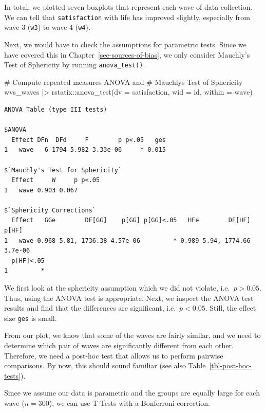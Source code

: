 \documentclass[
  letterpaper,
  DIV=11,
  numbers=noendperiod]{scrreprt}
\newenvironment{Shaded}{\begin{snugshade}}{\end{snugshade}}
\newcommand{\AttributeTok}[1]{\textcolor[rgb]{0.40,0.45,0.13}{#1}}
\newcommand{\CommentTok}[1]{\textcolor[rgb]{0.37,0.37,0.37}{#1}}
\newcommand{\FunctionTok}[1]{\textcolor[rgb]{0.28,0.35,0.67}{#1}}
\newcommand{\NormalTok}[1]{\textcolor[rgb]{0.00,0.23,0.31}{#1}}
\newcommand{\SpecialCharTok}[1]{\textcolor[rgb]{0.37,0.37,0.37}{#1}}
\begin{document}
In total, we plotted seven boxplots that represent each wave of data
collection. We can tell that \texttt{satisfaction} with life has
improved slightly, especially from wave 3 (\texttt{w3}) to wave 4
(\texttt{w4}).

Next, we would have to check the assumptions for parametric tests. Since
we have covered this in Chapter~\ref{sec-sources-of-bias}, we only
consider Mauchly's Test of Sphericity by running \texttt{anova\_test()}.

\begin{Shaded}
\begin{Highlighting}[]
\CommentTok{\# Compute repeated measures ANOVA and}
\CommentTok{\# Mauchly\textquotesingle{}s Test of Sphericity}
\NormalTok{wvs\_waves }\SpecialCharTok{|\textgreater{}}
\NormalTok{  rstatix}\SpecialCharTok{::}\FunctionTok{anova\_test}\NormalTok{(}\AttributeTok{dv =}\NormalTok{ satisfaction,}
                      \AttributeTok{wid =}\NormalTok{ id,}
                      \AttributeTok{within =}\NormalTok{ wave)}
\end{Highlighting}
\end{Shaded}

\begin{verbatim}
ANOVA Table (type III tests)

$ANOVA
  Effect DFn  DFd     F        p p<.05   ges
1   wave   6 1794 5.982 3.33e-06     * 0.015

$`Mauchly's Test for Sphericity`
  Effect     W     p p<.05
1   wave 0.903 0.067      

$`Sphericity Corrections`
  Effect   GGe        DF[GG]    p[GG] p[GG]<.05   HFe        DF[HF]   p[HF]
1   wave 0.968 5.81, 1736.38 4.57e-06         * 0.989 5.94, 1774.66 3.7e-06
  p[HF]<.05
1         *
\end{verbatim}

We first look at the sphericity assumption which we did not violate,
i.e.~\(p > 0.05\). Thus, using the ANOVA test is appropriate. Next, we
inspect the ANOVA test results and find that the differences are
significant, i.e.~\(p < 0.05\). Still, the effect size \texttt{ges} is
small.

From our plot, we know that some of the waves are fairly similar, and we
need to determine which pair of waves are significantly different from
each other. Therefore, we need a post-hoc test that allows us to perform
pairwise comparisons. By now, this should sound familiar (see also
Table~\ref{tbl-post-hoc-tests}).

Since we assume our data is parametric and the groups are equally large
for each wave (\(n = 300\)), we can use T-Tests with a Bonferroni
correction.
\end{document}
